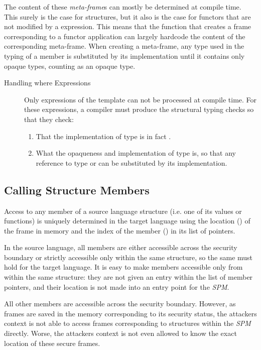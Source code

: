 The content of these \emph{meta-frame}s can mostly be determined at compile time. This surely is the case for structures, but it also is the case for functors that are not modified by a  expression.
This means that the function that creates a frame corresponding to a functor application can largely hardcode the content of the corresponding meta-frame.
When creating a meta-frame, any type used in the typing of a member is substituted by its implementation until it contains only opaque types, counting  as an opaque type.

\begin{description}
\item[Handling where Expressions] 
Only  expressions of the template  can not be processed at compile time.
For these expressions, a compiler must produce the structural typing checks so that they check:%
\begin{enumerate}
\item That the implementation of type  is in fact .
\item What the opaqueness and implementation of type  is, so that any reference to type  or  can be substituted by its implementation.
\end{enumerate}
\end{description}
\subsection{Calling Structure Members}
Access to any member of a source language structure (i.e. one of its values or functions) is uniquely determined in the target language using the location () of the frame in memory and the index of the member () in its list of pointers.

In the source language, all members are either accessible across the security boundary or strictly accessible only within the same structure, so the same must hold for the target language.
It is easy to make members accessible only from within the same structure: they are not given an entry within the list of member pointers, and their location is not made into an entry point for the \emph{SPM}.

All other members are accessible across the security boundary. However, as frames are saved in the memory corresponding to its security status, the attackers context is not able to access frames corresponding to structures within the \emph{SPM} directly.
Worse, the attackers context is not even allowed to know the exact location  of these secure frames.

